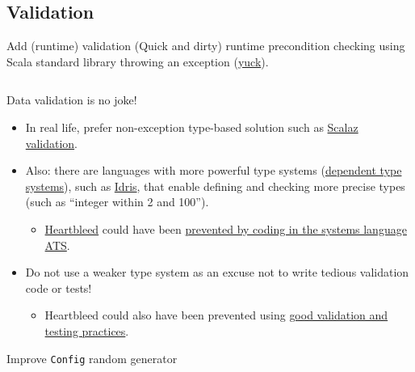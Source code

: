 \subsection{Validation}

\begin{frame}[fragile]{Add (runtime) validation}
  (Quick and dirty) \alert{runtime} precondition checking using Scala standard library throwing an \alert{exception} (\href{http://blog.jessitron.com/2013/06/whats-dirtier-than-comments-exceptions.html}{yuck}).

  \inputminted[gobble=2]{scala}{FizzBuzz3Validate.scala}
\end{frame}

\begin{frame}[fragile]{Data validation is no joke!}
  \begin{itemize}
  \item In real life, prefer non-exception type-based solution such as \href{http://eed3si9n.com/learning-scalaz/Validation.html}{Scalaz validation}.
  \item Also: there are languages with more powerful type systems (\href{http://en.wikipedia.org/wiki/Dependent_type}{dependent type systems}), such as \href{http://www.idris-lang.org/}{Idris}, that enable defining and checking more precise types (such as ``integer within 2 and 100'').
    \begin{itemize}
    \item \href{http://heartbleed.com/}{Heartbleed} could have been \href{http://bluishcoder.co.nz/2014/04/11/preventing-heartbleed-bugs-with-safe-languages.html}{prevented by coding in the systems language ATS}.
    \end{itemize}
  \item Do not use a weaker type system as an \alert{excuse} not to write tedious validation code or tests!
    \begin{itemize}
    \item Heartbleed could also have been prevented using \href{http://martinfowler.com/articles/testing-culture.html}{good validation and testing practices}.
    \end{itemize}
  \end{itemize}
\end{frame}

\begin{frame}[fragile]{Improve \texttt{Config} random generator}
  \inputminted[gobble=2]{scala}{FizzBuzzSpec7.scala}
\end{frame}

